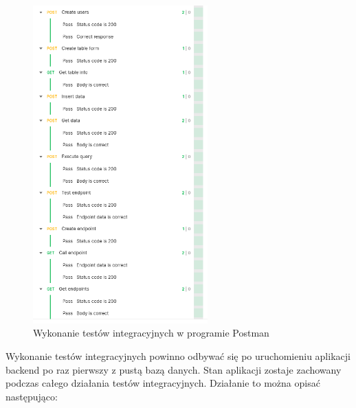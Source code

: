 \begin{figure}[h]
    \centering
    \includegraphics[width=0.6\textwidth]{./img/postman_test_exec.png}
    \caption{Wykonanie testów integracyjnych w programie Postman}
    \label{postmanTestExec}
\end{figure}

\FloatBarrier

Wykonanie testów integracyjnych powinno odbywać się po uruchomieniu aplikacji
backend po raz pierwszy z pustą bazą danych. Stan aplikacji zostaje zachowany
podczas całego działania testów integracyjnych. Działanie to można opisać
następująco:


